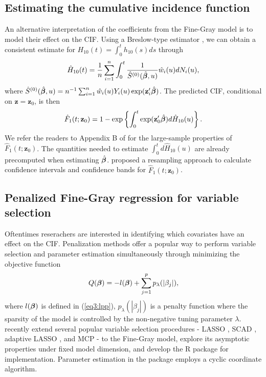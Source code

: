 \subsection{Estimating the cumulative incidence function}
An alternative interpretation of the coefficients from the Fine-Gray model is to model their effect on the CIF. Using a Breslow-type estimator \citep{breslow1974covariance}, we can obtain a consistent estimate for $H_{10}(t) = \int_0^t h_{10}(s)ds$ through
\begin{align*}
\hat{H}_{10}(t) = \frac{1}{n} \sum_{i=1}^n \int_0^t \frac{1}{\hat{S}^{(0)}(\hat{\bm \beta}, u)}\hat{w}_i(u)dN_i(u),
\end{align*}
where $\hat{S}^{(0)}(\hat{\bm \beta}, u) = n^{-1} \sum_{i=1}^n \hat{w}_i(u)Y_i(u)\exp(\mathbf{z}_i^\prime\hat{\bm \beta})$.
The predicted CIF, conditional on $\mathbf{z} = \mathbf{z}_0$, is then
\begin{align*}
\hat{F}_1(t;\mathbf{z}_0) = 1 - \exp\left\{\int_0^t \exp(\mathbf{z}^\prime_0 \hat{\bm \beta})d\hat{H}_{10}(u)\right\}.
\end{align*}
We refer the readers to Appendix B of \cite{fine1999proportional} for the large-sample properties of $\hat{F}_1(t; \mathbf{z}_0)$. The quantities needed to estimate $\int_0^t d\hat{H}_{10}(u)$ are already precomputed when estimating $\hat{\bm \beta}$. \cite{fine1999proportional} proposed a resampling approach to calculate confidence intervals and confidence bands for $\hat{F}_1(t; \mathbf{z}_0)$.
 

\subsection{Penalized Fine-Gray regression for variable selection}
\label{s3:pen}

Oftentimes reserachers are interested in identifying which covariates have an effect on the CIF. Penalization methods  \citep{tibshirani1996regression, fan2001variable, zou2006adaptive, zhang2010regularization} offer a popular way to perform variable selection and parameter estimation simultaneously through minimizing the objective function
\begin{align}
Q(\bm \beta) = -l(\bm \beta) + \sum_{j=1}^p p_\lambda(|\beta_j|),
\end{align}
where $l(\bm \beta)$ is defined in (\ref{eq3:lpp}), $p_{\lambda}(|\beta_j|)$ is a penalty function where the sparsity of the model is controlled by the non-negative tuning parameter $\lambda$. \cite{fu2017penalized} recently extend several popular variable selection procedures - LASSO \citep{tibshirani1996regression}, SCAD \citep{fan2001variable}, adaptive LASSO \citep{zou2006adaptive}, and MCP \citep{zhang2010nearly} - to the Fine-Gray model, explore its asymptotic properties under fixed model dimension, and develop the {R} package  \citep{crrp} for implementation. Parameter estimation in the  package employs a cyclic coordinate algorithm.

